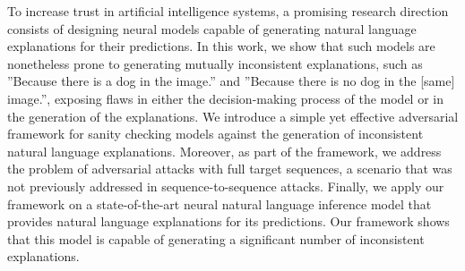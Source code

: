 To increase trust in artificial intelligence systems, a promising research direction consists of designing neural models capable of generating natural language explanations for their predictions. In this work, we show that such models are nonetheless prone to generating mutually inconsistent explanations, such as ''Because there is a dog in the image.'' and ''Because there is no dog in the [same] image.'', exposing flaws in either the decision-making process of the model or in the generation of the explanations. We introduce a simple yet effective adversarial framework for sanity checking models against the generation of inconsistent natural language explanations. Moreover, as part of the framework, we address the problem of adversarial attacks with full target sequences, a scenario that was not previously addressed in sequence-to-sequence attacks. Finally, we apply our framework on a state-of-the-art neural natural language inference model that provides natural language explanations for its predictions. Our framework shows that this model is capable of generating a significant number of inconsistent explanations.
